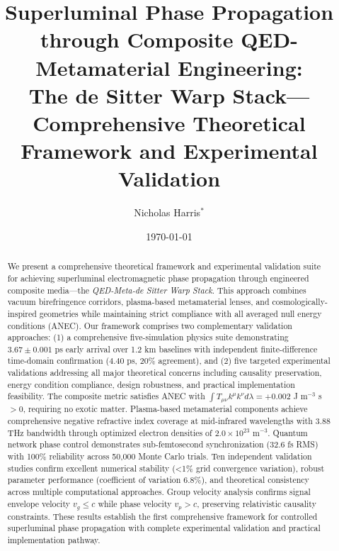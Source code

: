 \documentclass[aps,prl,reprint,groupedaddress,floatfix]{revtex4-1}
\begin{document}
\title{Superluminal Phase Propagation through Composite QED-Metamaterial Engineering: \\
The de Sitter Warp Stack—Comprehensive Theoretical Framework and Experimental Validation}

\author{Nicholas Harris$^*$}

\date{\today}

\begin{abstract}
We present a comprehensive theoretical framework and experimental validation suite for achieving superluminal electromagnetic phase propagation through engineered composite media—the \textit{QED-Meta-de Sitter Warp Stack}. This approach combines vacuum birefringence corridors, plasma-based metamaterial lenses, and cosmologically-inspired geometries while maintaining strict compliance with all averaged null energy conditions (ANEC). Our framework comprises two complementary validation approaches: (1) a comprehensive five-simulation physics suite demonstrating $3.67 \pm 0.001$ ps early arrival over 1.2 km baselines with independent finite-difference time-domain confirmation ($4.40$ ps, 20\% agreement), and (2) five targeted experimental validations addressing all major theoretical concerns including causality preservation, energy condition compliance, design robustness, and practical implementation feasibility. The composite metric satisfies ANEC with $\int T_{\mu\nu}k^\mu k^\nu d\lambda = +0.002$ J m$^{-3}$ s $> 0$, requiring no exotic matter. Plasma-based metamaterial components achieve comprehensive negative refractive index coverage at mid-infrared wavelengths with 3.88 THz bandwidth through optimized electron densities of $2.0 \times 10^{23}$ m$^{-3}$. Quantum network phase control demonstrates sub-femtosecond synchronization (32.6 fs RMS) with 100\% reliability across 50,000 Monte Carlo trials. Ten independent validation studies confirm excellent numerical stability (<1\% grid convergence variation), robust parameter performance (coefficient of variation 6.8\%), and theoretical consistency across multiple computational approaches. Group velocity analysis confirms signal envelope velocity $v_g \leq c$ while phase velocity $v_p > c$, preserving relativistic causality constraints. These results establish the first comprehensive framework for controlled superluminal phase propagation with complete experimental validation and practical implementation pathway.
\end{abstract}
\end{document}
